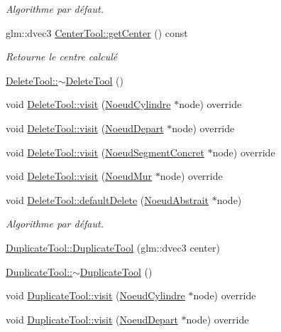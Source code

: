 \begin{DoxyCompactItemize}
\begin{DoxyCompactList}\small\item\em Algorithme par défaut. \end{DoxyCompactList}\item 
glm\+::dvec3 \hyperlink{group__inf2990_gaf086e5f530c5189f4b72563a4abfe35f}{Center\+Tool\+::get\+Center} () const 
\begin{DoxyCompactList}\small\item\em Retourne le centre calculé \end{DoxyCompactList}\item 
\hyperlink{group__inf2990_ga4a54f710ae3ca5e4eb8e16610d07c3bc}{Delete\+Tool\+::$\sim$\+Delete\+Tool} ()
\item 
void \hyperlink{group__inf2990_gaf91f134881ce52596486855f405e8f96}{Delete\+Tool\+::visit} (\hyperlink{class_noeud_cylindre}{Noeud\+Cylindre} $\ast$node) override
\item 
void \hyperlink{group__inf2990_ga9efc126da05a809724a3a2597ac4cb57}{Delete\+Tool\+::visit} (\hyperlink{class_noeud_depart}{Noeud\+Depart} $\ast$node) override
\item 
void \hyperlink{group__inf2990_ga1908b4ee57bb2dfbf4022412b48470d8}{Delete\+Tool\+::visit} (\hyperlink{class_noeud_segment_concret}{Noeud\+Segment\+Concret} $\ast$node) override
\item 
void \hyperlink{group__inf2990_ga816147276bc393b0552e031441541726}{Delete\+Tool\+::visit} (\hyperlink{class_noeud_mur}{Noeud\+Mur} $\ast$node) override
\item 
void \hyperlink{group__inf2990_gab16541bc54ef7e060c56d59d64798805}{Delete\+Tool\+::default\+Delete} (\hyperlink{class_noeud_abstrait}{Noeud\+Abstrait} $\ast$node)
\begin{DoxyCompactList}\small\item\em Algorithme par défaut. \end{DoxyCompactList}\item 
\hyperlink{group__inf2990_ga13dd0524e005f4a44dbaeea9f237d761}{Duplicate\+Tool\+::\+Duplicate\+Tool} (glm\+::dvec3 center)
\item 
\hyperlink{group__inf2990_gaab141bc62b424e5e0bfc48bd899bcb8a}{Duplicate\+Tool\+::$\sim$\+Duplicate\+Tool} ()
\item 
void \hyperlink{group__inf2990_gab91de27487440694048c1a0fbcc74da7}{Duplicate\+Tool\+::visit} (\hyperlink{class_noeud_cylindre}{Noeud\+Cylindre} $\ast$node) override
\item 
void \hyperlink{group__inf2990_ga5fa8bbf01a90c95062c8104ebdf5bb62}{Duplicate\+Tool\+::visit} (\hyperlink{class_noeud_depart}{Noeud\+Depart} $\ast$node) override

\end{DoxyCompactItemize}
